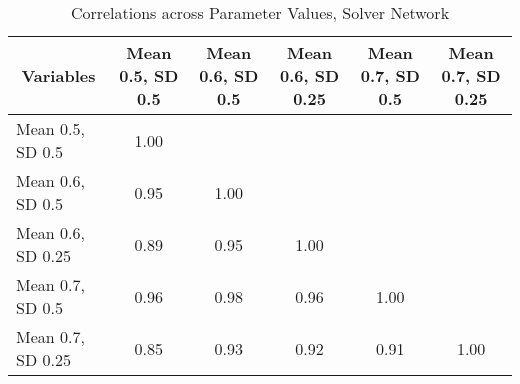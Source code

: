 \begin{table}[htbp]\centering \caption{Correlations across Parameter Values, Solver Network\label{corr_solver}}
\begin{tabular}{l  c  c  c  c  c }\hline\hline
\multicolumn{1}{c}{Variables} &Mean 0.5, SD 0.5&Mean 0.6, SD 0.5&Mean 0.6, SD 0.25&Mean 0.7, SD 0.5&Mean 0.7, SD 0.25\\ \hline
Mean 0.5, SD 0.5&1.00\\
Mean 0.6, SD 0.5&0.95&1.00\\
Mean 0.6, SD 0.25&0.89&0.95&1.00\\
Mean 0.7, SD 0.5&0.96&0.98&0.96&1.00\\
Mean 0.7, SD 0.25&0.85&0.93&0.92&0.91&1.00\\
\hline \hline 
 \end{tabular}
\end{table}
